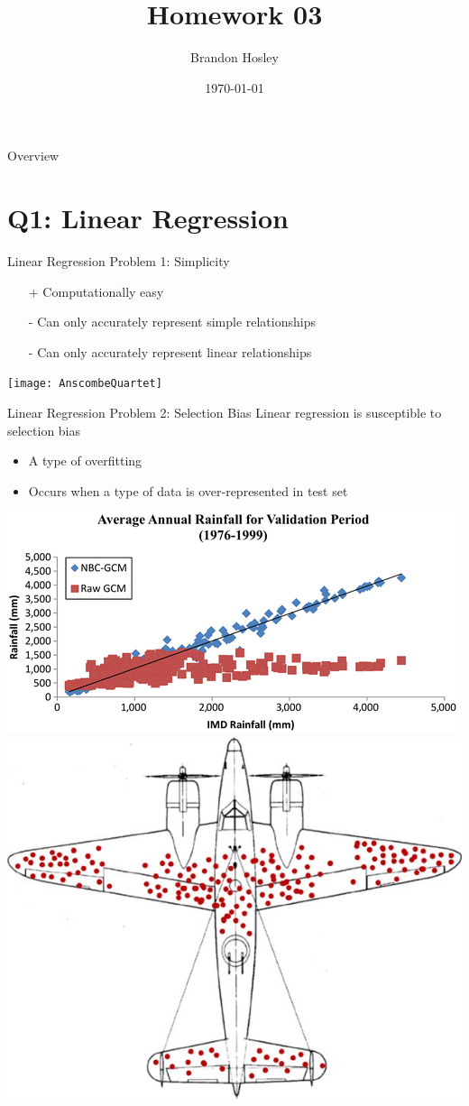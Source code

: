 \documentclass{beamer}
\title{Homework 03}
\author{Brandon Hosley}
\institute{University of Illinois - Springfield}
\date{\today}
\begin{document}
\frame{\titlepage}

\begin{frame}{Overview}
\tableofcontents
\end{frame}

\section[Q1]{Q1: Linear Regression}

\begin{frame}{Linear Regression Problem 1: Simplicity}
	\begin{itemize}
		\item[+] Computationally easy
		\item[-] Can only accurately represent simple relationships
		\item[-] Can only accurately represent linear relationships
	\end{itemize}
	\texttt{[image: AnscombeQuartet]}
\end{frame}

\begin{frame}{Linear Regression Problem 2: Selection Bias}
	Linear regression is susceptible to selection bias
	\begin{itemize}
		\item A type of overfitting
		\item Occurs when a type of data is over-represented in test set
	\end{itemize}
	\includegraphics[width=0.45\linewidth]{SelectionBias}
	\includegraphics[width=0.45\linewidth]{SelectionAnecdote}
\end{frame}
\end{document}

